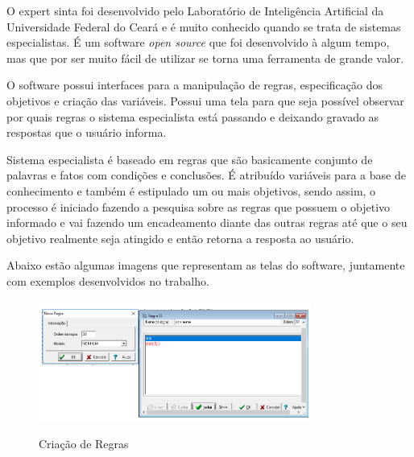 O expert sinta foi desenvolvido pelo  Laboratório de Inteligência Artificial da Universidade Federal do Ceará e é muito conhecido quando se trata de sistemas especialistas. É um software \textit{open source} que foi desenvolvido à algum tempo, mas que por ser muito fácil de utilizar se torna uma ferramenta de grande valor. \cite{Jones}

O software possui interfaces para a manipulação de regras, especificação dos objetivos e criação das variáveis. Possui uma tela para que seja possível observar por quais regras o sistema especialista está passando e deixando gravado as respostas que o usuário informa.

Sistema especialista é baseado em regras que são basicamente conjunto de palavras e fatos com condições e conclusões. É atribuído variáveis para a base de conhecimento e também é estipulado um ou mais objetivos, sendo assim, o processo é iniciado fazendo a pesquisa sobre as regras que possuem o objetivo informado e vai fazendo um encadeamento diante das outras regras até que o seu objetivo realmente seja atingido e então retorna a resposta ao usuário.

Abaixo estão algumas imagens que representam as telas do software, juntamente com exemplos desenvolvidos no trabalho.

\begin{figure}[H]
    \centering
    \caption{Criação de Regras}
    \includegraphics[width=0.8\textwidth]{regra1.PNG}
    \label{regras1}
\end{figure}

